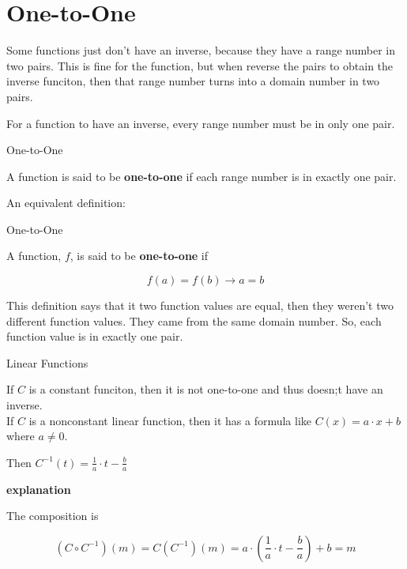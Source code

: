 \documentclass{ximera}
\begin{document}
\section{One-to-One}


Some functions just don't have an inverse, because they have a range number in two pairs.  This is fine for the function, but when reverse the pairs to obtain the inverse funciton, then that range number turns into a domain number in two pairs.


For a function to have an inverse, every range number must be in only one pair.



\begin{definition} One-to-One


A function is said to be \textbf{one-to-one} if each range number is in exactly one pair.


\end{definition}



An equivalent definition:

\begin{definition} One-to-One


A function, $f$, is said to be \textbf{one-to-one} if 


\[    f(a) = f(b) \rightarrow a = b           \]


\end{definition}





This definition says that it two function values are equal, then they weren't two different function values.  They came from the same domain number.  So, each function value is in exactly one pair.








\begin{example} Linear Functions

If $C$ is a constant funciton, then it is not one-to-one and thus doesn;t have an inverse. \\


If $C$ is a nonconstant linear function, then it has a formula like $C(x) = a \cdot x + b$ where $a \ne 0$.


Then $C^{-1}(t) = \frac{1}{a} \cdot t - \frac{b}{a}$


\textbf{\textcolor{purple!50!blue!90!black}{explanation}}



The composition is 

\[  (C \circ C^{-1})(m) = C(C^{-1})(m) =     a \cdot \left(\frac{1}{a} \cdot t - \frac{b}{a}\right) + b  = m \]




\end{example}
\end{document}
